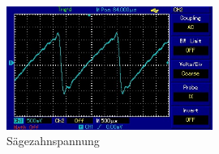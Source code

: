 \begin{figure}
  \centering
  \includegraphics[width=0.6\textwidth]{bilder/saegezahn.jpg}
  \caption{Sägezahnspannung}
  \label{fig:säge}
\end{figure}
